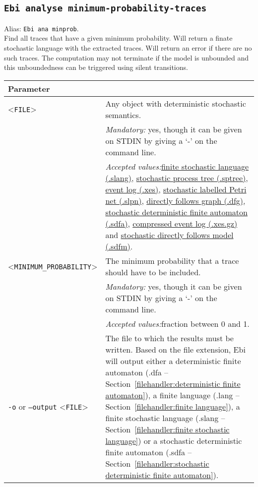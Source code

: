 {\subsection{\texttt{Ebi analyse minimum-probability-traces}}
\label{command:Ebi analyse minimum-probability-traces}
Alias: \texttt{Ebi ana minprob}.\\
Find all traces that have a given minimum probability.
Will return a finate stochastic language with the extracted traces.
Will return an error if there are no such traces.
The computation may not terminate if the model is unbounded and this unboundedness can be triggered using silent transitions.\\
\begin{tabularx}{\linewidth}{lX}
\toprule
Parameter \\\midrule
<\texttt{FILE}>&Any object with deterministic stochastic semantics.\\
&\textit{Mandatory:} \quad yes, though it can be given on STDIN by giving a `-' on the command line.\\
&\textit{Accepted values:}\quad \hyperref[filehandler:finite stochastic language]{finite stochastic language (.slang)}, \hyperref[filehandler:stochastic process tree]{stochastic process tree (.sptree)}, \hyperref[filehandler:event log]{event log (.xes)}, \hyperref[filehandler:stochastic labelled Petri net]{stochastic labelled Petri net (.slpn)}, \hyperref[filehandler:directly follows graph]{directly follows graph (.dfg)}, \hyperref[filehandler:stochastic deterministic finite automaton]{stochastic deterministic finite automaton (.sdfa)}, \hyperref[filehandler:compressed event log]{compressed event log (.xes.gz)} and \hyperref[filehandler:stochastic directly follows model]{stochastic directly follows model (.sdfm)}.\\
<\texttt{MINIMUM\_PROBABILITY}>&The minimum probability that a trace should have to be included.\\
&\textit{Mandatory:} \quad yes, though it can be given on STDIN by giving a `-' on the command line.\\
&\textit{Accepted values:}\quad fraction between 0 and 1.\\
\texttt{-o} or \texttt{--output} <\texttt{FILE}> &
The file to which the results must be written. Based on the file extension, Ebi will output either a deterministic finite automaton (.dfa -- Section~\ref{filehandler:deterministic finite automaton}), a finite language (.lang -- Section~\ref{filehandler:finite language}), a finite stochastic language (.slang -- Section~\ref{filehandler:finite stochastic language}) or a stochastic deterministic finite automaton (.sdfa -- Section~\ref{filehandler:stochastic deterministic finite automaton}).

\end{tabularx}}
